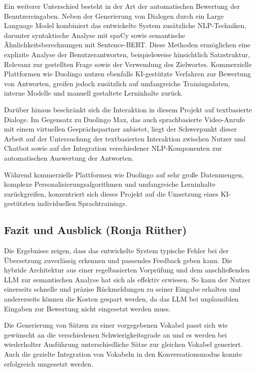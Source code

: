 Ein weiterer Unterschied besteht in der Art der automatischen Bewertung der Benutzereingaben. 
Neben der Generierung von Dialogen durch ein Large Language Model kombiniert das entwickelte System zusätzliche NLP-Techniken, darunter syntaktische Analyse mit spaCy sowie semantische Ähnlichkeitsberechnungen mit Sentence-BERT. 
Diese Methoden ermöglichen eine explizite Analyse der Benutzerantworten, beispielsweise hinsichtlich Satzstruktur, Relevanz zur gestellten Frage sowie der Verwendung des Zielwortes.
Kommerzielle Plattformen wie Duolingo nutzen ebenfalls KI-gestützte Verfahren zur Bewertung von Antworten, greifen jedoch zusätzlich auf umfangreiche Trainingsdaten, interne Modelle und manuell gestaltete Lerninhalte zurück.

Darüber hinaus beschränkt sich die Interaktion in diesem Projekt auf textbasierte Dialoge. 
Im Gegensatz zu Duolingo Max, das auch sprachbasierte Video-Anrufe mit einem virtuellen Gesprächspartner anbietet, liegt der Schwerpunkt dieser Arbeit auf der Untersuchung der textbasierten Interaktion zwischen Nutzer und Chatbot sowie auf der Integration verschiedener NLP-Komponenten zur automatischen Auswertung der Antworten.

Während kommerzielle Plattformen wie Duolingo auf sehr große Datenmengen, komplexe Personalisierungsalgorithmen und umfangreiche Lerninhalte zurückgreifen, konzentriert sich dieses Projekt auf die Umsetzung eines KI-gestützten individuellen Sprachtrainings.

\subsection{Fazit und Ausblick (Ronja Rüther)}
Die Ergebnisse zeigen, dass das entwickelte System typische Fehler bei der Übersetzung zuverlässig erkennen und passendes Feedback geben kann.
Die hybride Architektur aus einer regelbasierten Vorprüfung und dem anschließenden LLM zur semantischen Analyse hat sich als effektiv erwiesen. 
So kann der Nutzer einerseits schnelle und präzise Rückmeldungen zu seiner Eingabe erhalten und andererseits können die Kosten gespart werden, da das LLM bei unplausiblen Eingaben zur Bewertung nicht eingesetzt werden muss.

Die Generierung von Sätzen zu einer vorgegebenen Vokabel passt sich wie gewünscht an die verschiedenen Schwierigkeitsgrade an und es werden bei wiederholter Ausführung unterschiedliche Sätze zur gleichen Vokabel generiert.
Auch die gezielte Integration von Vokabeln in den Konversationsmodus konnte erfolgreich umgesetzt werden.

